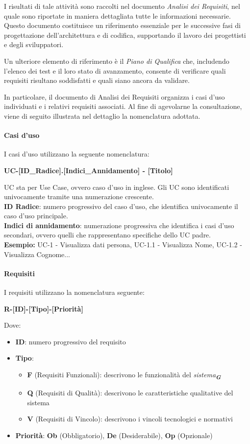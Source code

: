 \documentclass[a4paper,12pt]{article}
\newcommand{\glossario}[1]{\textit{#1}\textsubscript{\textbf{\textit{\textcolor{lightblack}{G}}}}}
\begin{document}
I risultati di tale attività sono raccolti nel documento \textit{Analisi dei Requisiti}, nel quale sono riportate in maniera dettagliata tutte le informazioni necessarie. Questo documento costituisce un riferimento essenziale per le successive fasi di progettazione dell'architettura e di codifica, supportando il lavoro dei progettisti e degli sviluppatori.

Un ulteriore elemento di riferimento è il \textit{Piano di Qualifica} che, includendo l'elenco dei test e il loro stato di avanzamento, consente di verificare quali requisiti risultano soddisfatti e quali siano ancora da validare.

In particolare, il documento di Analisi dei Requisiti organizza i casi d'uso individuati e i relativi requisiti associati. Al fine di agevolarne la consultazione, viene di seguito illustrata nel dettaglio la nomenclatura adottata.
 
\paragraph{Casi d'uso}
I casi d'uso utilizzano la seguente nomenclatura:

\centerline{\textbf{UC-[ID\_Radice].[Indici\_Annidamento] - [Titolo]}}

UC sta per Use Case, ovvero caso d'uso in inglese. Gli UC sono identificati univocamente tramite una numerazione crescente. \\
\textbf{ID Radice}: numero progressivo del caso d'uso, che identifica univocamente il caso d'uso principale. \\
\textbf{Indici di annidamento}: numerazione progressiva che identifica i casi d'uso secondari, ovvero quelli che rappresentano specifiche dello UC padre. \\
\textbf{Esempio:} UC-1 - Visualizza dati persona, UC-1.1 - Visualizza Nome, UC-1.2 - Visualizza Cognome...
\paragraph{Requisiti}
I requisiti utilizzano la nomenclatura seguente:

\centerline{\textbf{R-[ID]-[Tipo]-[Priorità]}}

Dove:
\begin{itemize}
    \item \textbf{ID}: numero progressivo del requisito
    \item \textbf{Tipo}:
    \begin{itemize}
        \item  \textbf{F} (Requisiti Funzionali): descrivono le funzionalità del \glossario{sistema}
        \item \textbf{Q} (Requisiti di Qualità): descrivono le caratteristiche qualitative del sistema 
        \item \textbf{V} (Requisiti di Vincolo): descrivono i vincoli tecnologici e normativi

    \end{itemize}
\item \textbf{Priorità}: \textbf{Ob} (Obbligatorio), \textbf{De} (Desiderabile), \textbf{Op} (Opzionale)
\end{itemize}
\end{document}
